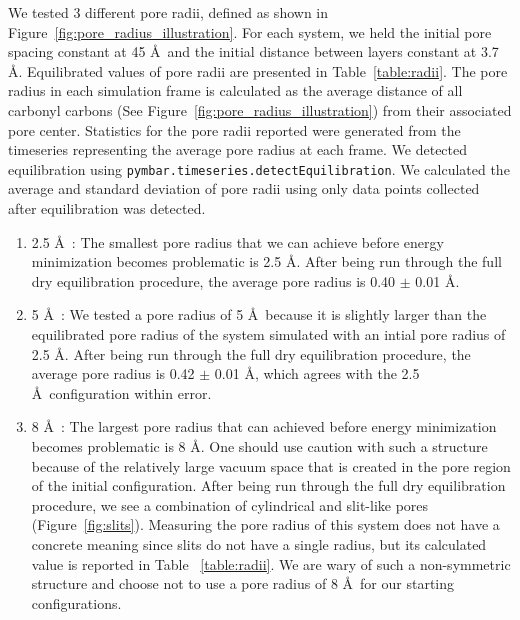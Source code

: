 \documentclass{article}
\begin{document}
\begin{enumerate}
	  We tested 3 different pore radii, defined as shown in
	  Figure~\ref{fig:pore_radius_illustration}. For each system, we held the initial
	  pore spacing constant at 45 \AA~and the initial distance between layers
	  constant at 3.7 \AA. Equilibrated values of pore radii are presented in
	  Table~\ref{table:radii}. The pore radius in each simulation frame is calculated
	  as the average distance of all carbonyl carbons (See
	  Figure~\ref{fig:pore_radius_illustration}) from their associated pore center.
	  Statistics for the pore radii reported were generated from the timeseries
	  representing the average pore radius at each frame. We detected equilibration
	  using \texttt{pymbar.timeseries.detectEquilibration}. We calculated the average
	  and standard deviation of pore radii using only data points collected after
	  equilibration was detected.

	  \begin{enumerate}

		\item 2.5 \AA~: The smallest pore radius that we can achieve
		before energy minimization becomes problematic is 2.5 \AA. After being run
		through the full dry equilibration procedure, the average pore radius is 0.40
		$\pm$ 0.01 \AA.

		\item 5 \AA~: We tested a pore radius of 5 \AA~because it is
		slightly larger than the equilibrated pore radius of the system simulated with
		an intial pore radius of 2.5 \AA. After being run through the full dry
		equilibration procedure, the average pore radius is 0.42 $\pm$ 0.01 \AA, which
		agrees with the 2.5 \AA~configuration within error. 

		\item 8 \AA~: The largest pore radius that can achieved before
		energy minimization becomes problematic is 8 \AA. One should use caution with
		such a structure because of the relatively large vacuum space that is created
		in the pore region of the initial configuration. After being run through the
		full dry equilibration procedure, we see a combination of cylindrical and
		slit-like pores (Figure~\ref{fig:slits}). Measuring the pore radius of this
		system does not have a concrete meaning since slits do not have a single
		radius, but its calculated value is reported in Table ~\ref{table:radii}. We
		are wary of such a non-symmetric structure and choose not to use a pore radius
		of 8 \AA~for our starting configurations. 
	  
	  \end{enumerate}


\end{enumerate}
\end{document}
